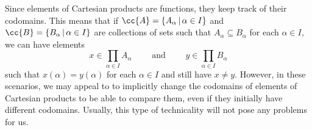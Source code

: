 Since elements of Cartesian products are functions, they keep track of their codomains.
This means that if $\cc{A} = \{ A_{\alpha} \,|\, \alpha\in I \}$ and $\cc{B} = \{ B_{\alpha} \,|\, \alpha\in I \}$ are collections of sets such that $A_{\alpha}\subseteq B_{\alpha}$ for each $\alpha\in I$, we can have elements
\[ x\in\prod_{\alpha\in I} A_{\alpha} \qquad\text{ and }\qquad y\in\prod_{\alpha\in I} B_{\alpha} \]
such that $x(\alpha) = y(\alpha)$ for each $\alpha\in I$ and still have $x\ne y$. 
However, in these scenarios, we may appeal to  to implicitly change the codomains of elements of Cartesian products to be able to compare them, even if they initially have different codomains. 
Usually, this type of technicality will not pose any problems for us. 
\fi 





